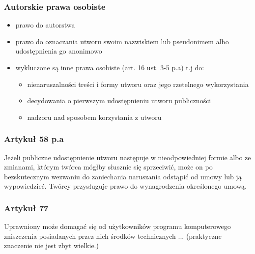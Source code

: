 \documentclass[12pt,a4paper]{article}
\begin{document}
\subsubsection{Autorskie prawa osobiste}
\begin{itemize}
\item prawo do autorstwa
\item prawo do oznaczania utworu swoim nazwiskiem lub pseudonimem albo udostępnienia go anonimowo
\item wykluczone są inne prawa osobiste (art. 16 ust. 3-5 p.a) t.j do:
	\begin{itemize}
		\item nienaruszalności treści i formy utworu oraz jego rzetelnego wykorzystania
		\item decydowania o pierwszym udostępnieniu utworu publiczności
		\item nadzoru nad sposobem korzystania z utworu
	\end{itemize}
\end{itemize}

\subsubsection{Artykuł 58 p.a} 
Jeżeli publiczne udostępnienie utworu następuje w nieodpowiedniej formie albo ze zmianami, którym twórca mógłby słusznie się sprzeciwić, może on po bezskutecznym wezwaniu do zaniechania naruszania odstąpić od umowy lub ją wypowiedzieć. Twórcy przysługuje prawo do wynagrodzenia określonego umową.

\subsubsection{Artykuł 77}
Uprawniony może domagać się od użytkowników programu komputerowego zniszczenia posiadanych przez nich środków technicznych ... (praktyczne znaczenie nie jest zbyt wielkie.)
\end{document}
